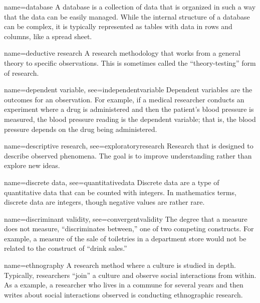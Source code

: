 {name={database}}
{%
	A database is a collection of data that is organized in such a way that the data can be easily managed. While the internal structure of a database can be complex, it is typically represented as tables with data in rows and columns, like a spread sheet.
}

{name={deductive research}}
{%
	A research methodology that works from a general theory to specific observations. This is sometimes called the ``theory-testing'' form of research.
}

{name={dependent variable},
	see={independentvariable}}
{%
	Dependent variables are the outcomes for an observation. For example, if a medical researcher conducts an experiment where a drug is administered and then the patient's blood pressure is measured, the blood pressure reading is the dependent variable; that is, the blood pressure depends on the drug being administered.
}

{name={descriptive research},
 see={exploratoryresearch}}
{%
	Research that is designed to describe observed phenomena. The goal is to improve 	understanding rather than explore new ideas.
}

{name={discrete data},
	see={quantitativedata}}
{%
	Discrete data are a type of quantitative data that can be counted with integers. In mathematics terms, discrete data are integers, though negative values are rather rare. 
}

{name={discriminant validity},
	see={convergentvalidity}}
{%
	The degree that a measure does not measure, ``discriminates between,'' one of two competing constructs. For example, a measure of the sale of toiletries in a department store would not be related to the construct of ``drink sales.'' 
}


{name={ethnography}}
{%
	A research method where a culture is studied in depth. Typically, researchers ``join'' a culture and observe social interactions from within. As a example, a researcher who lives in a commune for several years and then writes about social interactions observed is conducting ethnographic research.
}

